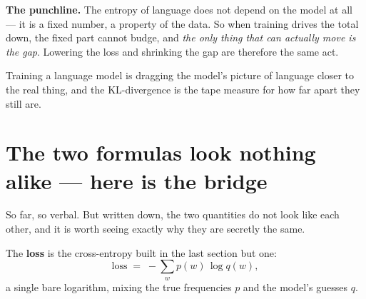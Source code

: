\documentclass[11pt]{article}
\begin{document}
\textbf{The punchline.} The entropy of language does not depend on the model at all --- it is a
fixed number, a property of the data. So when training drives the total down, the fixed part
cannot budge, and \emph{the only thing that can actually move is the gap}. Lowering the loss and
shrinking the gap are therefore the same act.
\begin{summary}
Training a language model is dragging the model's picture of language closer to the real thing,
and the KL-divergence is the tape measure for how far apart they still are.
\end{summary}

\section{The two formulas look nothing alike --- here is the bridge}

So far, so verbal. But written down, the two quantities do not look like each other, and it is
worth seeing exactly why they are secretly the same.

The \textbf{loss} is the cross-entropy built in the last section but one:
\[
  \text{loss} \;=\; -\sum_w p(w)\,\log q(w),
\]
a single bare logarithm, mixing the true frequencies $p$ and the model's guesses $q$.
\end{document}
